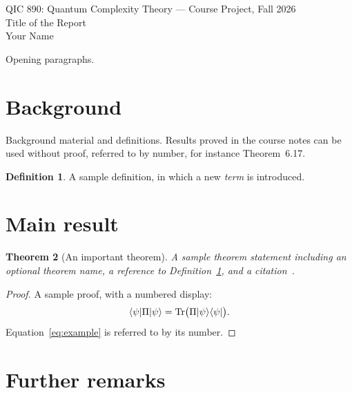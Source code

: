 \documentclass[12pt]{memoir}
\theoremstyle{definition}
\newtheorem{definition}{Definition}[section]
\theoremstyle{plain}
\newtheorem{theorem}[definition]{Theorem}
\theoremstyle{remark}
\numberwithin{equation}{section}
\DeclarePairedDelimiter\bra{\langle}{\rvert}
\DeclarePairedDelimiter\ket{\lvert}{\rangle}
\newcommand{\tr}{\operatorname{Tr}}
\newcommand{\reporttitle}{Title of the Report}
\newcommand{\reportauthor}{Your Name}
\begin{document}
\begin{center}
  {\small QIC 890: Quantum Complexity Theory --- Course Project, Fall 2026}
  \\[8mm]
  {\fontsize{24}{28}\selectfont \reporttitle}\\[6mm]
  {\large \reportauthor}
\end{center}

\vspace{6mm}


Opening paragraphs.

\section{Background}

Background material and definitions. Results proved in the course notes can be
used without proof, referred to by number, for instance Theorem~6.17.

\begin{definition}
  \label{def:example}
  A sample definition, in which a new \emph{term} is introduced.
\end{definition}

\section{Main result}

\begin{theorem}[An important theorem]
  \label{thm:main}
  A sample theorem statement including an optional theorem name, a reference
  to Definition~\ref{def:example}, and a citation~\cite{Kitaev--Shen--Vyalyi}.
\end{theorem}

\begin{proof}
  A sample proof, with a numbered display:
  \begin{equation}
    \label{eq:example}
    \bra{\psi} \Pi \ket{\psi} = \tr\bigl(\Pi \ket{\psi}\bra{\psi}\bigr).
  \end{equation}
  Equation~\eqref{eq:example} is referred to by its number.
\end{proof}

\section{Further remarks}
\end{document}
